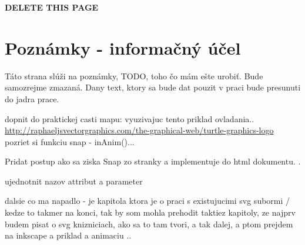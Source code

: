 {\Huge\textbf{ DELETE THIS PAGE}}
\section{Poznámky - informačný účel}
Táto strana slúži na poznámky, TODO, toho čo mám ešte urobiť. 
Bude samozrejme zmazaná.  
Dany text, ktory sa bude dat pouzit v praci bude presunuti do jadra prace. 

dopnit do praktickej casti mapu: vyuzivajuc tento priklad ovladania.. 
\url{http://raphaeljsvectorgraphics.com/the-graphical-web/turtle-graphics-logo}
pozriet si funkciu snap - inAnim()...


Pridat postup ako sa ziska Snap zo stranky a implementuje do html dokumentu. .

ujednotnit nazov attribut a parameter

dalsie co ma napadlo - je kapitola \cite[p.~81]{Dawber} ktora je o praci s existujucimi svg subormi / kedze to takmer na konci, tak by som mohla prehodit taktiez kapitoly, ze najprv budem pisat o svg knizniciach, ako sa to tam tvori, a tak dalej, a ptom prejdem na inkscape a priklad a animaciu .. 

